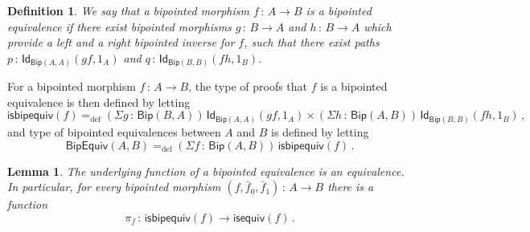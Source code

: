 \documentclass[10pt,a4paper,oneside,reqno]{amsart}
\numberwithin{equation}{section}
\theoremstyle{mythm}
\newtheorem{lemma}[theorem]{Lemma}
\theoremstyle{mydef}
\newtheorem{definition}[theorem]{Definition}
\theoremstyle{myrmk}
\newcommand{\ie}{\text{i.e.\ }}
\newcommand{\myemph}[1]{\textit{#1}}
\newcommand{\defeq}{=_{\mathrm{def}}}
\newcommand{\co}{\,{:}\,}
\newcommand{\isequiv}{\mathsf{isequiv}}
\newcommand{\Id}{\mathsf{Id}}
\newcommand{\Bip}{\mathsf{Bip}}
\newcommand{\BipHom}{\mathsf{Bip}}
\newcommand{\isbipequiv}{\mathsf{isbipequiv}}
\newcommand{\BipEquiv}{\mathsf{BipEquiv}}
\begin{document}
\begin{definition} We say that a bipointed morphism $f \co A \to B$ is a \myemph{bipointed equivalence}
if there exist bipointed morphisms $g \co B \to A$ and $h \co B \to A$ which provide a left and a right bipointed inverse for $f$, \ie such that there exist paths $p \co \Id_{\Bip(A,A)}(g  f, 1_A)$ 
and $q \co \Id_{\Bip(B,B)} ( f  h, 1_B)$.
\end{definition}

For a bipointed morphism $f \co A \to B$, the type of proofs that $f$ is a bipointed equivalence is
then defined by letting
\[
\isbipequiv(f) \defeq   (\Sigma g \co \BipHom(B,A)) \,  \Id_{\Bip(A,A)}( g  f, 1_A ) \times 
    (\Sigma h \co \BipHom(A, B)) \, \Id_{\Bip(B,B)} (f  h , 1_B ) \, ,
\]
and type of bipointed equivalences between $A$ and $B$ is defined by letting
\[
\BipEquiv(A, B)
\defeq    
(\Sigma f \co \BipHom(A,B)) \, \isbipequiv(f)  \, . 
\] 


\begin{lemma} The underlying function of a bipointed equivalence is an equivalence. In particular,
for every bipointed morphism $(f, \bar{f}_0, \bar{f}_1) \co A \to B$  there is a  function 
\[
\pi_f \co \isbipequiv(f) \to \isequiv(f) \, .
\]
\end{lemma} 
\end{document}
